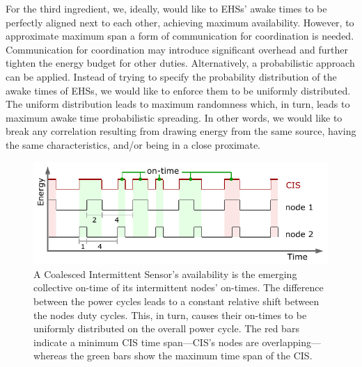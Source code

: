 \documentclass{article}
\newcommand{\fullsys}{Coalesced Intermittent Sensor\xspace}
\newcommand{\sys}{CIS\xspace}
\begin{document}
For the third ingredient, we, ideally, would like to EHSs' awake times to be perfectly aligned next to each other, achieving maximum availability. However, to approximate maximum span a form of communication for coordination is needed. Communication for coordination may introduce significant overhead and further tighten the energy budget for other duties. 
Alternatively, a probabilistic approach can be applied. 
Instead of trying to specify the probability distribution of the awake times of EHSs, we would like to enforce them to be uniformly distributed.  
The uniform distribution leads to maximum randomness which, in turn, leads to maximum awake time probabilistic spreading. In other words, we would like to break any correlation resulting from drawing energy from the same source, having the same characteristics, and/or being in a close proximate.   

\begin{figure}[t]
		\centering
		\includegraphics[width=.5\columnwidth]{figures/cisOntime}
		\caption{A \fullsys's availability is the emerging collective on-time of its intermittent nodes' on-times. The difference between the power cycles leads to a constant relative shift between the nodes duty cycles. This, in turn, causes their on-times to be uniformly distributed on the overall power cycle. The red bars indicate a minimum \sys time span---\sys's nodes are overlapping---whereas the green bars show the maximum time span of the \sys.}
		\label{fig:cisOntime}
\end{figure} 
\end{document}
